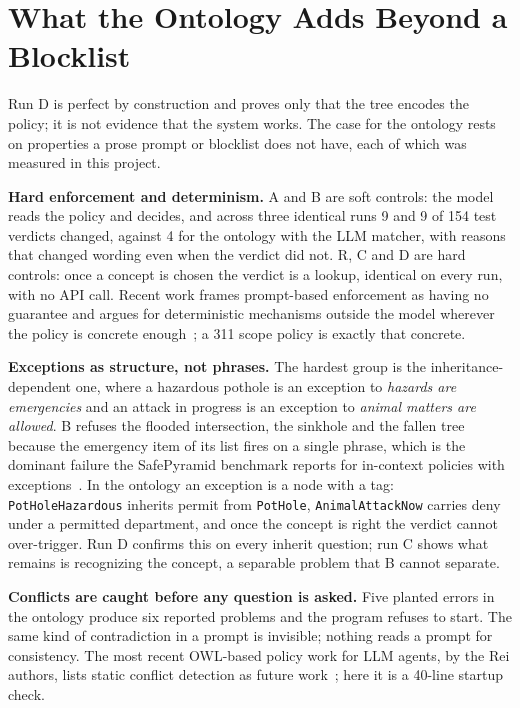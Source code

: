 \documentclass[conference]{IEEEtran}
\begin{document}
\section{What the Ontology Adds Beyond a Blocklist}

Run D is perfect by construction and proves only that the tree encodes the policy; it is not evidence that the system works. The case for the ontology rests on properties a prose prompt or blocklist does not have, each of which was measured in this project.

\textbf{Hard enforcement and determinism.} A and B are soft controls: the model reads the policy and decides, and across three identical runs 9 and 9 of 154 test verdicts changed, against 4 for the ontology with the LLM matcher, with reasons that changed wording even when the verdict did not. R, C and D are hard controls: once a concept is chosen the verdict is a lookup, identical on every run, with no API call. Recent work frames prompt-based enforcement as having no guarantee and argues for deterministic mechanisms outside the model wherever the policy is concrete enough~\cite{baracaldo2026}; a 311 scope policy is exactly that concrete.

\textbf{Exceptions as structure, not phrases.} The hardest group is the inheritance-dependent one, where a hazardous pothole is an exception to \emph{hazards are emergencies} and an attack in progress is an exception to \emph{animal matters are allowed}. B refuses the flooded intersection, the sinkhole and the fallen tree because the emergency item of its list fires on a single phrase, which is the dominant failure the SafePyramid benchmark reports for in-context policies with exceptions~\cite{safepyramid2026}. In the ontology an exception is a node with a tag: \texttt{PotHoleHazardous} inherits permit from \texttt{PotHole}, \texttt{AnimalAttackNow} carries deny under a permitted department, and once the concept is right the verdict cannot over-trigger. Run D confirms this on every inherit question; run C shows what remains is recognizing the concept, a separable problem that B cannot separate.

\textbf{Conflicts are caught before any question is asked.} Five planted errors in the ontology produce six reported problems and the program refuses to start. The same kind of contradiction in a prompt is invisible; nothing reads a prompt for consistency. The most recent OWL-based policy work for LLM agents, by the Rei authors, lists static conflict detection as future work~\cite{agenticrei2026}; here it is a 40-line startup check.
\end{document}
